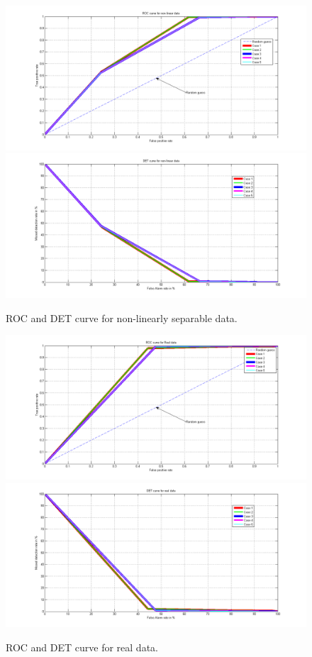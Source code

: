 \documentclass[10pt]{report}
\begin{document}
\begin{figure}[!htb]
  \includegraphics[width=\linewidth]{roc_nonlin.png}
\endminipage\hfill
{}
  \includegraphics[width=\linewidth]{det_nonlin.png}
\endminipage\hfill
\caption{ROC and DET curve for non-linearly separable data.}
\end{figure}

\begin{figure}[!htb]
  \includegraphics[width=\linewidth]{roc_real.png}
\endminipage\hfill
{}
  \includegraphics[width=\linewidth]{det_real.png}
\endminipage\hfill
\caption{ROC and DET curve for real data.}
\end{figure}
\end{document}
